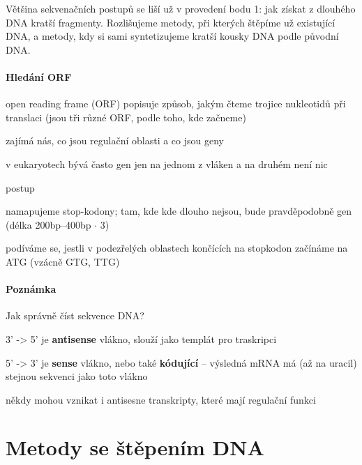 \documentclass[DIV=8]{scrreprt}
\newcommand{\mybox}[2]{
    \paragraph{#1} #2
}
\begin{document}
Většina sekvenačních postupů se liší už v provedení bodu 1: jak získat z dlouhého DNA kratší fragmenty. Rozlišujeme metody, při kterých štěpíme už existující DNA, a metody, kdy si sami syntetizujeme kratší kousky DNA podle původní DNA.

\paragraph{Hledání ORF}
\begin{myItemize}[nosep]
    \item open reading frame (ORF) popisuje způsob, jakým čteme trojice nukleotidů při translaci (jsou tři různé ORF, podle toho, kde začneme)
    \item zajímá nás, co jsou regulační oblasti a co jsou geny
\begin{myItemize}[nosep]
    \item v eukaryotech bývá často gen jen na jednom z vláken a na druhém není nic
\end{myItemize}

    \item postup
\begin{myEnumerate}[nosep]
    \item namapujeme stop-kodony; tam, kde kde dlouho nejsou, bude pravděpodobně gen (délka 200bp--400bp \(\cdot\) 3)
    \item podíváme se, jestli v podezřelých oblastech končících na stopkodon začínáme na ATG (vzácně GTG, TTG)
\end{myEnumerate}

\end{myItemize}



\mybox{Poznámka}{Jak správně číst sekvence DNA?
\begin{myItemize}[nosep]
    \item 3' -> 5' je \textbf{antisense} vlákno, slouží jako templát pro traskripci
    \item 5' -> 3' je \textbf{sense} vlákno, nebo také \textbf{kódující} -- výsledná mRNA má (až na uracil) stejnou sekvenci jako toto vlákno
    \item někdy mohou vznikat i antisesne transkripty, které mají regulační funkci
\end{myItemize}

}


\section{Metody se štěpením DNA} \label{Metody se štěpením DNA} \FloatBarrier
\end{document}
